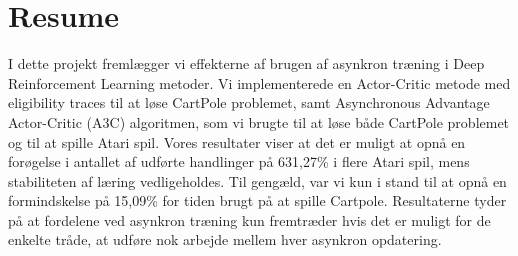 \documentclass[11pt]{article}
\begin{document}
\section*{Resume}


I dette projekt fremlægger vi effekterne af brugen af asynkron træning
i Deep Reinforcement Learning metoder.
Vi implementerede en Actor-Critic metode med eligibility traces til at løse
CartPole problemet, samt
Asynchronous Advantage Actor-Critic (A3C) algoritmen, som vi brugte
til at løse både CartPole problemet og til at spille Atari spil.
Vores resultater viser at det er muligt at opnå en forøgelse i
antallet af udførte handlinger på 631,27\% i flere Atari spil,
mens stabiliteten af læring vedligeholdes.
Til gengæld, var vi kun i stand til at opnå en formindskelse på 15,09\% for tiden
brugt på at spille Cartpole.
Resultaterne tyder på at fordelene ved asynkron træning kun fremtræder
hvis det er muligt for de enkelte tråde, at udføre nok arbejde mellem hver asynkron opdatering.
\end{document}
